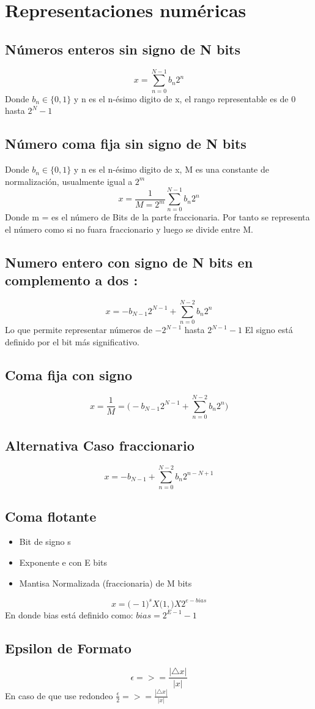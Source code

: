 \section {Representaciones numéricas}
\subsection{Números enteros sin signo de N bits}
 $$
  x = \sum_{n=0}^{N-1} b_n2^{n}
 $$ Donde  $b_n \in \{ 0,1 \} $ y n es el n-ésimo digito de x, el rango representable es de  0 hasta $ 2^N -1 $
\subsection{Número coma fija sin signo de N bits}
Donde  $b_n \in \{ 0,1 \} $ y n es el n-ésimo digito de x, M es una constante de normalización, usualmente igual a $ 2^m $
$$
	 x = \frac{1}{M = 2^m}\sum_{n=0}^{N-1} b_n2^{n}	
$$ Donde  m = es el número de Bits de la parte fraccionaria. Por tanto se representa el número como si no fuara fraccionario y luego se divide entre M.

\subsection{Numero entero con signo  de N bits en complemento a dos : }
$$
 x = -b_{N-1}2^{N-1} +  \sum_{n =0}^{N-2} b_n2^n
$$ Lo que permite representar números de $ -2^{N-1}$ hasta $ 2^{N-1} -1  $ El signo está definido por el bit más significativo.
\subsection{ Coma fija con signo }
$$
 x = \frac{1}{M} = \big( -b_{N-1}2^{N-1} +  \sum_{n =0}^{N-2} b_n2^n  \big) 
$$
\subsection {Alternativa  Caso fraccionario}
$$
  x = -b_{N-1}+ \sum_{n=0}^{N-2} b_n2^{n-N+1}
$$
\subsection{ Coma flotante}
\begin{itemize}
\item Bit de signo s
\item Exponente e con E bits
\item Mantisa Normalizada (fraccionaria) de M bits
\end{itemize}
$$
 x = \big(  -1 \big)^s X \big(1,\big) X 2^{e - bias}
$$ En donde  bias está definido como: $ bias = 2^{E-1} -1 $
\subsection{ Epsilon de Formato}
$$
 \epsilon = >= \frac{|\triangle x|}{|x| } 
$$
En caso de que use redondeo $\frac {\epsilon}{2} = >= \frac{|\triangle x|}{|x| } $